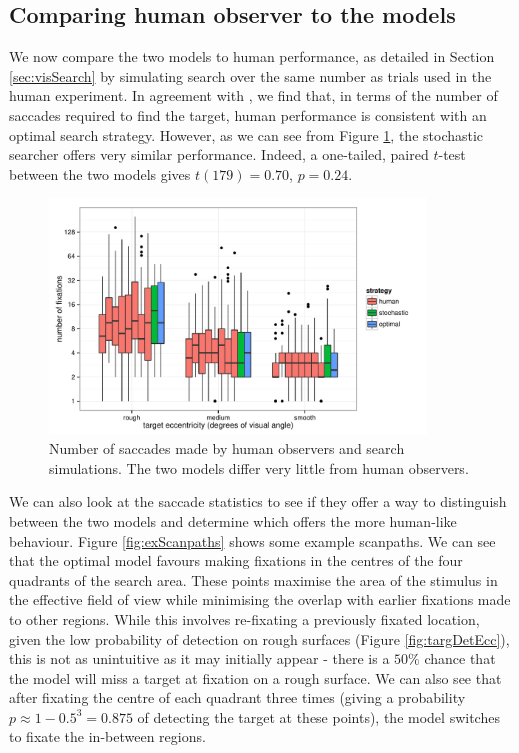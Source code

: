\documentclass[preprint, authoryear]{elsarticle} %
\begin{document}
\subsection{Comparing human observer to the models}

We now compare the two models to human performance, as detailed in Section \ref{sec:visSearch}
by simulating search over the same number as trials used in the human experiment. In agreement with \citet{najemnik-geisler2008}, we find that, in terms of the number of saccades required to find the target, human performance is consistent with an optimal search strategy. However, as we can see from Figure \ref{fig:numFixHumanModel}, the stochastic searcher offers very similar performance. Indeed, a one-tailed, paired $t$-test between the two models gives $t(179)=0.70$, $p=0.24$. 

\begin{figure}
	\centering
	\includegraphics[width=10cm]{fig/modelComp/numFixHumanModel.pdf}
	\caption{Number of saccades made by human observers and search simulations. The two models differ very little from human observers.} 
	\label{fig:numFixHumanModel}
\end{figure}

We can also look at the saccade statistics to see if they offer a way to distinguish between the two models and determine which offers the more human-like behaviour. Figure \ref{fig:exScanpaths} shows some example scanpaths. We can see that the optimal model favours making fixations in the centres of the four quadrants of the search area. These points maximise the area of the stimulus in the effective field of view while minimising the overlap with earlier fixations made to other regions. While this involves re-fixating a previously fixated location, given the low probability of detection on rough surfaces (Figure \ref{fig:targDetEcc}), this is not as unintuitive as it may initially appear - there is a $50\%$ chance that the model will miss a target at fixation on a rough surface. We can also see that after fixating the centre of each quadrant three times (giving a probability $p \approx 1-0.5^3 = 0.875$ of detecting the target at these points), the model switches to fixate the in-between regions. 
\end{document}
